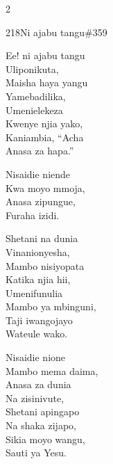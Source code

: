 \begin{multicols}{2}
\begin{hymn}{218}{Ni ajabu tangu}{\#359}
\begin{stanza}
Ee! ni ajabu tangu\\
Uliponikuta,\\
Maisha haya yangu\\
Yamebadilika,\\
Umenielekeza\\
Kwenye njia yako,\\
Kaniambia, ``Acha\\
Anasa za hapa.''
\end{stanza}
\begin{chorus}
Nisaidie niende\\
Kwa moyo mmoja,\\
Anasa zipungue,\\
Furaha izidi.
\end{chorus}
\begin{stanza}
Shetani na dunia\\
Vinanionyesha,\\
Mambo nisiyopata\\
Katika njia hii,\\
Umenifunulia\\
Mambo ya mbinguni,\\
Taji iwangojayo\\
Wateule wako.
\end{stanza}
\begin{stanza}
Nisaidie nione\\
Mambo mema daima,\\
Anasa za dunia\\
Na zisinivute,\\
Shetani apingapo\\
Na shaka zijapo,\\
Sikia moyo wangu,\\
Sauti ya Yesu.
\end{stanza}
\end{hymn}


\end{multicols}
